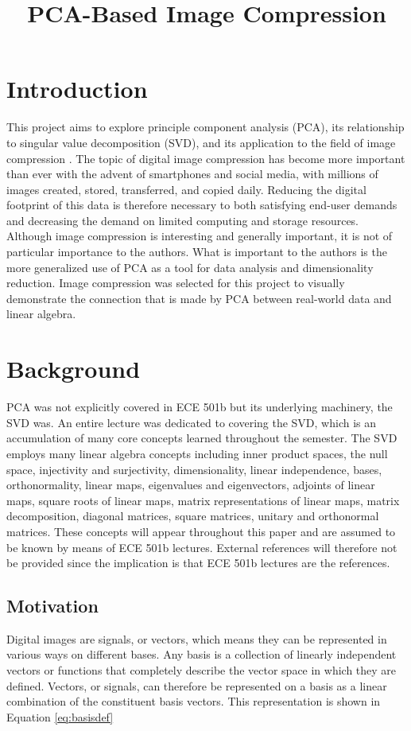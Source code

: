 \documentclass[conference]{IEEEtran}
\title{PCA-Based Image Compression}
\author{
\IEEEauthorblockN{Owen Sowatzke}
\IEEEauthorblockA{\textit{Electrical Engineering Department} \\
\textit{University of Arizona}\\
Tucson, USA \\
osowatzke@arizona.edu}
\and
\IEEEauthorblockN{Scott Thoesen}
\IEEEauthorblockA{\textit{Electrical Engineering Department} \\
\textit{University of Arizona}\\
Tucson, USA \\
thoesens@arizona.edu}}
\begin{document}
    \maketitle
		
    \section{Introduction}
    This project aims to explore principle component analysis (PCA), its relationship to singular value decomposition (SVD), and its application to the field of image compression \cite{jaradet_svd_image_compression}. The topic of digital image compression has become more important than ever with the advent of smartphones and social media, with millions of images created, stored, transferred, and copied daily. Reducing the digital footprint of this data is therefore necessary to both satisfying end-user demands and decreasing the demand on limited computing and storage resources. Although image compression is interesting and generally important, it is not of particular importance to the authors. What is important to the authors is the more generalized use of PCA as a tool for data analysis and dimensionality reduction. Image compression was selected for this project to visually demonstrate the connection that is made by PCA between real-world data and linear algebra.

    \section{Background}
    PCA was not explicitly covered in ECE 501b but its underlying machinery, the SVD was. An entire lecture was dedicated to covering the SVD, which is an accumulation of many core concepts learned throughout the semester. The SVD employs many linear algebra concepts including inner product spaces, the null space, injectivity and surjectivity, dimensionality, linear independence, bases, orthonormality, linear maps, eigenvalues and eigenvectors, adjoints of linear maps, square roots of linear maps, matrix representations of linear maps, matrix decomposition, diagonal matrices, square matrices, unitary and orthonormal matrices. These concepts will appear throughout this paper and are assumed to be known by means of ECE 501b lectures. External references will therefore not be provided since the implication is that ECE 501b lectures are the references.

    \subsection{Motivation}
    Digital images are signals, or vectors, which means they can be represented in various ways on different bases. Any basis is a collection of linearly independent vectors or functions that completely describe the vector space in which they are defined. Vectors, or signals, can therefore be represented on a basis as a linear combination of the constituent basis vectors. This representation is shown in Equation \ref{eq:basisdef}
\end{document}

